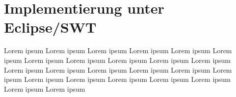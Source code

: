 \section{Implementierung unter Eclipse/SWT}
Lorem ipsum Lorem ipsum Lorem ipsum Lorem ipsum Lorem ipsum Lorem ipsum Lorem ipsum Lorem ipsum 
Lorem ipsum Lorem ipsum Lorem ipsum Lorem ipsum Lorem ipsum Lorem ipsum Lorem ipsum Lorem ipsum 
Lorem ipsum Lorem ipsum Lorem ipsum Lorem ipsum Lorem ipsum Lorem ipsum Lorem ipsum Lorem ipsum 